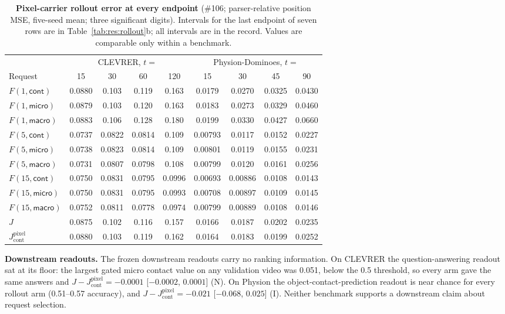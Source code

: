 \begin{table}[h]
\begin{revblock}
\centering
\footnotesize
\setlength{\tabcolsep}{3pt}
\caption{\textbf{Pixel-carrier rollout error at every endpoint} (\#106; parser-relative position MSE, five-seed mean; three significant digits). Intervals for the last endpoint of seven rows are in Table~\ref{tab:res:rollout}b; all intervals are in the record. Values are comparable only within a benchmark.}
\label{tab:app:res:pixel}
\begin{tabular}{@{}lcccc@{\hspace{10pt}}cccc@{}}
\toprule
& \multicolumn{4}{c}{CLEVRER, $t=$} & \multicolumn{4}{c}{Physion-Dominoes, $t=$} \\
\cmidrule(lr){2-5}\cmidrule(l){6-9}
Request & 15 & 30 & 60 & 120 & 15 & 30 & 45 & 90 \\
\midrule
$F(1,\textsf{cont})$ & 0.0880 & 0.103 & 0.119 & 0.163 & 0.0179 & 0.0270 & 0.0325 & 0.0430 \\
$F(1,\textsf{micro})$ & 0.0879 & 0.103 & 0.120 & 0.163 & 0.0183 & 0.0273 & 0.0329 & 0.0460 \\
$F(1,\textsf{macro})$ & 0.0883 & 0.106 & 0.128 & 0.180 & 0.0199 & 0.0330 & 0.0427 & 0.0660 \\
$F(5,\textsf{cont})$ & 0.0737 & 0.0822 & 0.0814 & 0.109 & 0.00793 & 0.0117 & 0.0152 & 0.0227 \\
$F(5,\textsf{micro})$ & 0.0738 & 0.0823 & 0.0814 & 0.109 & 0.00801 & 0.0119 & 0.0155 & 0.0231 \\
$F(5,\textsf{macro})$ & 0.0731 & 0.0807 & 0.0798 & 0.108 & 0.00799 & 0.0120 & 0.0161 & 0.0256 \\
$F(15,\textsf{cont})$ & 0.0750 & 0.0831 & 0.0795 & 0.0996 & 0.00693 & 0.00886 & 0.0108 & 0.0143 \\
$F(15,\textsf{micro})$ & 0.0750 & 0.0831 & 0.0795 & 0.0993 & 0.00708 & 0.00897 & 0.0109 & 0.0145 \\
$F(15,\textsf{macro})$ & 0.0752 & 0.0811 & 0.0778 & 0.0974 & 0.00799 & 0.00889 & 0.0108 & 0.0146 \\
$J$ & 0.0875 & 0.102 & 0.116 & 0.157 & 0.0166 & 0.0187 & 0.0202 & 0.0235 \\
$J_{\mathrm{cont}}^{\mathrm{pixel}}$ & 0.0880 & 0.103 & 0.119 & 0.162 & 0.0164 & 0.0183 & 0.0199 & 0.0252 \\
\bottomrule
\end{tabular}
\end{revblock}
\end{table}

\begin{revblock}
\textbf{Downstream readouts.} The frozen downstream readouts carry no ranking information. On CLEVRER the question-answering readout sat at its floor: the largest gated micro contact value on any validation video was 0.051, below the 0.5 threshold, so every arm gave the same answers and $J-J_{\mathrm{cont}}^{\mathrm{pixel}}=-0.0001$ [$-0.0002$, $0.0001$] (N). On Physion the object-contact-prediction readout is near chance for every rollout arm (0.51--0.57 accuracy), and $J-J_{\mathrm{cont}}^{\mathrm{pixel}}=-0.021$ [$-0.068$, $0.025$] (I). Neither benchmark supports a downstream claim about request selection.
\end{revblock}
